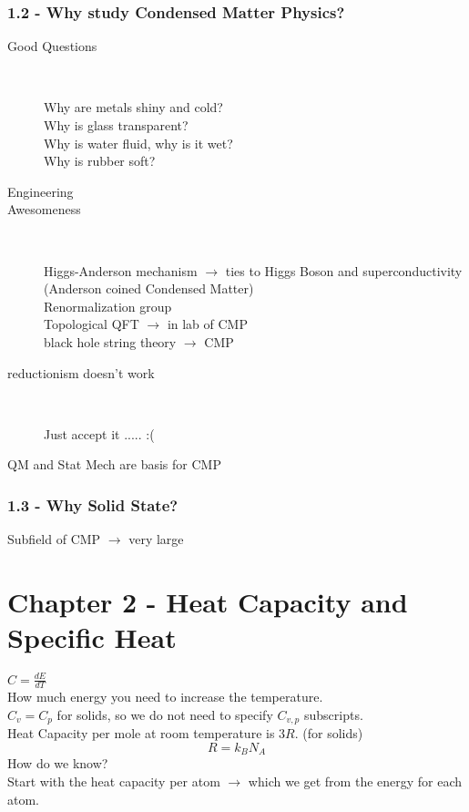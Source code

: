 \documentclass[english, 11pt]{article}
\begin{document}
			\subsubsection{1.2 - Why study Condensed Matter Physics?}
				\begin{description}
					\item[Good Questions] \

						Why are metals shiny and cold? \\
						Why is glass transparent? \\
						Why is water fluid, why is it wet? \\
						Why is rubber soft?\\
					\item[Engineering] 
		
					\item[Awesomeness] \

						Higgs-Anderson mechanism $\rightarrow$ ties to Higgs Boson and superconductivity (Anderson coined Condensed Matter) \\
						Renormalization group \\
						Topological QFT $\rightarrow$ in lab of CMP \\
						black hole string theory $\rightarrow$ CMP
					\item[reductionism doesn't work] \

						Just accept it ..... :(
					\item[QM and Stat Mech are basis for CMP] 
				\end{description}
				
			\subsubsection{1.3 - Why Solid State?}
				Subfield of CMP $\rightarrow$ very large
	
		\pagebreak

		\section{Chapter 2 - Heat Capacity and Specific Heat} 

		$C = \frac{dE}{dT}$ \\
		How much energy you need to increase the temperature.\\
		$C_v = C_p$ for solids, so we do not need to specify $C_{v,p}$ subscripts.\\
		Heat Capacity per mole at room temperature is $3R$. (for solids) \\
		\begin{equation*}
			R = k_B N_A
		\end{equation*}
		How do we know? \\
		Start with the heat capacity per atom $\rightarrow$ which we get from the energy for each atom. \\
		
\end{document}
